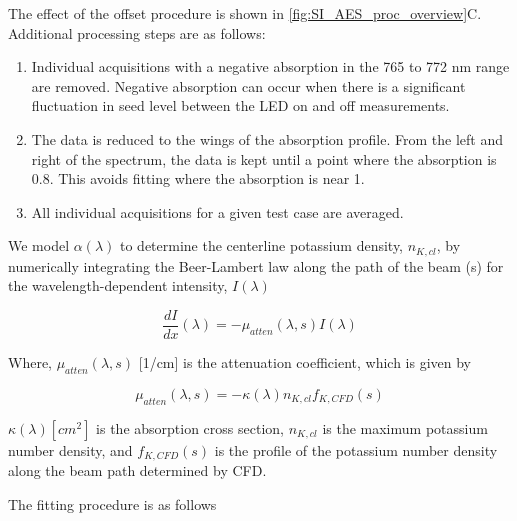 The effect of the offset procedure is shown in \ref{fig:SI_AES_proc_overview}C. Additional processing steps are as follows:

\begin{enumerate}
    \item Individual acquisitions with a negative absorption in the 765 to 772 nm range are removed. Negative absorption can occur when there is a significant fluctuation in seed level between the LED on and off measurements.
    \item The data is reduced to the wings of the absorption profile. From the left and right of the spectrum, the data is kept until a point where the absorption is 0.8. This avoids fitting where the absorption is near 1. 
    \item All individual acquisitions for a given test case are averaged.
\end{enumerate}

We model $\alpha(\lambda)$ to determine the centerline potassium density, $n_{K, cl}$, by numerically integrating the Beer-Lambert law along the path of the beam (s) for the wavelength-dependent intensity, $I(\lambda)$

\begin{equation}
    \frac{dI}{dx}(\lambda) = -\mu_{atten}(\lambda, s) I(\lambda)
\end{equation}

Where, $\mu_{atten} (\lambda, s)$ [1/cm] is the attenuation coefficient, which is given by 

\begin{equation}
    \mu_{atten}(\lambda, s) = -\kappa(\lambda) n_{K,cl} f_{K, CFD}(s)
\end{equation}

$\kappa(\lambda) [cm^2]$ is the absorption cross section, $n_{K,cl}$ is the maximum potassium number density, and $f_{K, CFD}(s)$ is the profile of the potassium number density along the beam path determined by CFD. 

The fitting procedure is as follows


